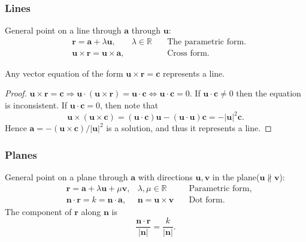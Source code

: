\documentclass[a4paper]{article}
\begin{document}
\subsubsection{Lines}
General point on a line through $ \mathbf{a} $ through $ \mathbf{u} $:
\[
  \begin{aligned}
    &\mathbf{r} = \mathbf{a}+\lambda\mathbf{u}, &\lambda\in
    \mathbb{R}\quad &\text{The parametric form.}\\
    &\mathbf{u} \times \mathbf{r} = \mathbf{u} \times \mathbf{a},&
    &\text{Cross form.}
  \end{aligned}
\]
\begin{proposition}\label{prop:line_equation_vec}
  Any vector equation of the form $ \mathbf{u}\times
  \mathbf{r}=\mathbf{c} $ represents a line.
\end{proposition}
\begin{proof}
  $ \mathbf{u}\times \mathbf{r}=\mathbf{c} \Rightarrow
  \mathbf{u}\cdot (\mathbf{u}\times \mathbf{r})=\mathbf{u}\cdot
  \mathbf{c} \Leftrightarrow \mathbf{u} \cdot \mathbf{c}=0 $. If $
  \mathbf{u} \cdot \mathbf{c}\neq 0 $ then the equation is
  inconsistent. If $ \mathbf{u}\cdot \mathbf{c} =0$, then note that
  \[
    \mathbf{u} \times (\mathbf{u} \times \mathbf{c})=(\mathbf{u}\cdot
    \mathbf{c})\mathbf{u}-(\mathbf{u}\cdot \mathbf{u})\mathbf{c} =
    -\left| \mathbf{u} \right|^2 \mathbf{c}
  .\]
  Hence $ \mathbf{a} = -(\mathbf{u} \times \mathbf{c})/|\mathbf{u}|^2
  $ is a solution, and thus it represents a line.
\end{proof}
\subsubsection{Planes}
General point on a plane through $ \mathbf{a} $ with directions $
\mathbf{u},\mathbf{v} $ in the plane($ \mathbf{u}\nparallel \mathbf{v} $):
\[
  \begin{aligned}
    &\mathbf{r} = \mathbf{a}+\lambda \mathbf{u}+\mu \mathbf{v},
    &\lambda, \mu\in \mathbb{R} &\quad \text{Parametric form,}\\
    & \mathbf{n} \cdot \mathbf{r} = k = \mathbf{n} \cdot \mathbf{a},
    & \mathbf{n} = \mathbf{u}\times \mathbf{v} &\quad \text{Dot form.}
  \end{aligned}
\]
The component of $\mathbf{r}$ along $ \mathbf{n} $ is
\[
  \frac{\mathbf{n}\cdot \mathbf{r}}{|\mathbf{n}|}=\frac{k}{|\mathbf{n}|}
.\]
\end{document}
